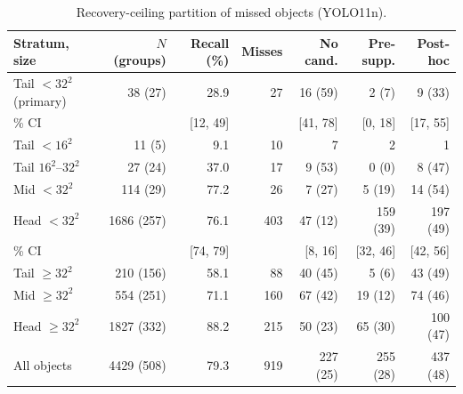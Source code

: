 \begin{table}[!htbp]
\footnotesize
\caption{Recovery-ceiling partition of missed objects (YOLO11n).}
\label{tab:partition}
\begin{tabular}{lrrrrrr}
\toprule
Stratum, size & $N$ (groups) & Recall (\%) & Misses & No cand. & Pre-supp. & Post-hoc \\
\midrule
Tail $<32^2$ (primary) & 38 (27) & 28.9 & 27 & 16 (59) & 2 (7) & 9 (33) \\
\quad 95\% CI & & [12, 49] & & [41, 78] & [0, 18] & [17, 55] \\
\quad Tail $<16^2$ & 11 (5) & 9.1 & 10 & 7 & 2 & 1 \\
\quad Tail $16^2$--$32^2$ & 27 (24) & 37.0 & 17 & 9 (53) & 0 (0) & 8 (47) \\
Mid $<32^2$ & 114 (29) & 77.2 & 26 & 7 (27) & 5 (19) & 14 (54) \\
Head $<32^2$ & 1686 (257) & 76.1 & 403 & 47 (12) & 159 (39) & 197 (49) \\
\quad 95\% CI & & [74, 79] & & [8, 16] & [32, 46] & [42, 56] \\
Tail $\geq 32^2$ & 210 (156) & 58.1 & 88 & 40 (45) & 5 (6) & 43 (49) \\
Mid $\geq 32^2$ & 554 (251) & 71.1 & 160 & 67 (42) & 19 (12) & 74 (46) \\
Head $\geq 32^2$ & 1827 (332) & 88.2 & 215 & 50 (23) & 65 (30) & 100 (47) \\
All objects & 4429 (508) & 79.3 & 919 & 227 (25) & 255 (28) & 437 (48) \\
\bottomrule
\end{tabular}
\end{table}
